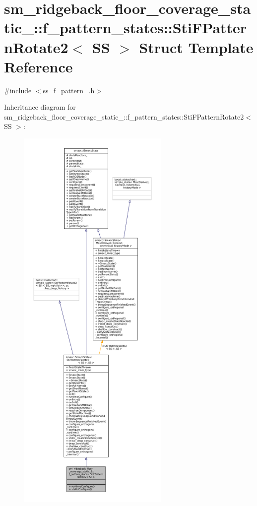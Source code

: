 \hypertarget{classsm__ridgeback__floor__coverage__static__1_1_1f__pattern__states_1_1StiFPatternRotate2}{}\section{sm\+\_\+ridgeback\+\_\+floor\+\_\+coverage\+\_\+static\+\_\+:\+:f\+\_\+pattern\+\_\+states\+:\+:Sti\+F\+Pattern\+Rotate2$<$ SS $>$ Struct Template Reference}
\label{classsm__ridgeback__floor__coverage__static__1_1_1f__pattern__states_1_1StiFPatternRotate2}


{\ttfamily \#include $<$ss\+\_\+f\+\_\+pattern\+\_.\+h$>$}



Inheritance diagram for sm\+\_\+ridgeback\+\_\+floor\+\_\+coverage\+\_\+static\+\_\+:\+:f\+\_\+pattern\+\_\+states\+:\+:Sti\+F\+Pattern\+Rotate2$<$ SS $>$\+:
\nopagebreak
\begin{figure}[H]
\begin{center}
\leavevmode
\includegraphics[height=550pt]{classsm__ridgeback__floor__coverage__static__1_1_1f__pattern__states_1_1StiFPatternRotate2__inherit__graph}
\end{center}
\end{figure}


